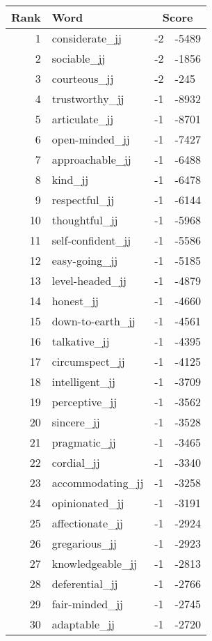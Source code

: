 \begin{longtable}[!htbp]{| rlr@{.}l |}
    \hline
    \textbf{Rank} & \textbf{Word} & \multicolumn{2}{c|}{\textbf{Score}} \\
    \hline
    \endhead
    1 & considerate\_jj & -2 & -5489 \\
    2 & sociable\_jj & -2 & -1856 \\
    3 & courteous\_jj & -2 & -245 \\
    4 & trustworthy\_jj & -1 & -8932 \\
    5 & articulate\_jj & -1 & -8701 \\
    6 & open-minded\_jj & -1 & -7427 \\
    7 & approachable\_jj & -1 & -6488 \\
    8 & kind\_jj & -1 & -6478 \\
    9 & respectful\_jj & -1 & -6144 \\
    10 & thoughtful\_jj & -1 & -5968 \\
    11 & self-confident\_jj & -1 & -5586 \\
    12 & easy-going\_jj & -1 & -5185 \\
    13 & level-headed\_jj & -1 & -4879 \\
    14 & honest\_jj & -1 & -4660 \\
    15 & down-to-earth\_jj & -1 & -4561 \\
    16 & talkative\_jj & -1 & -4395 \\
    17 & circumspect\_jj & -1 & -4125 \\
    18 & intelligent\_jj & -1 & -3709 \\
    19 & perceptive\_jj & -1 & -3562 \\
    20 & sincere\_jj & -1 & -3528 \\
    21 & pragmatic\_jj & -1 & -3465 \\
    22 & cordial\_jj & -1 & -3340 \\
    23 & accommodating\_jj & -1 & -3258 \\
    24 & opinionated\_jj & -1 & -3191 \\
    25 & affectionate\_jj & -1 & -2924 \\
    26 & gregarious\_jj & -1 & -2923 \\
    27 & knowledgeable\_jj & -1 & -2813 \\
    28 & deferential\_jj & -1 & -2766 \\
    29 & fair-minded\_jj & -1 & -2745 \\
    30 & adaptable\_jj & -1 & -2720 \\

\end{longtable}
